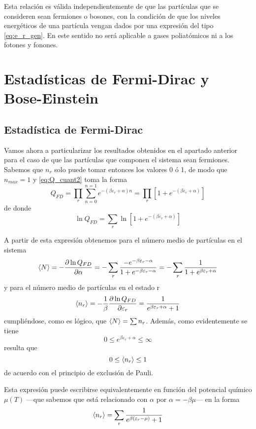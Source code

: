 Esta relación es válida independientemente de que las partículas que se consideren sean fermiones o bosones, con la condición de que los niveles energéticos de una partícula vengan dados por una expresión del tipo \eqref{eq:e_r_gen}.
En este sentido no será aplicable a gases poliatómicos ni a los fotones y fonones.
 
\section{Estadísticas de Fermi-Dirac y Bose-Einstein}
\subsection*{Estadística de Fermi-Dirac}

Vamos ahora a particularizar los resultados obtenidos en el apartado anterior para el caso de que las partículas que componen el sistema sean fermiones.
Sabemos que $n_r$ solo puede tomar entonces los valores 0 ó 1, de modo que $n_{max} = 1$ y \eqref{eq:Q_cuant2} toma la forma
\begin{equation}
	Q_{FD} = \prod_r \sum_{n=0}^{n=1} e^{-(\beta\varepsilon_r + \alpha) n} = \prod_r \left[ 1 + e^{ -( \beta\varepsilon_r + \alpha)} \right]
\end{equation}
de donde
\begin{equation}
	\ln Q_{FD} = \sum_r \ln \left[ 1 + e^{ -( \beta\varepsilon_r + \alpha)} \right]
\end{equation}

A partir de esta expresión obtenemos para el número medio de partículas en el sistema
\begin{equation}
	\expval{N} = - \frac{\partial \ln Q_{FD}}{\partial \alpha} = - \sum_r \frac{-e^{-\beta\varepsilon_r - \alpha}}{1 + e^{-\beta\varepsilon_r - \alpha}} = - \sum_r \frac{1}{1 + e^{\beta\varepsilon_r + \alpha}}
\end{equation}
y para el número medio de partículas en el estado r
\begin{equation}\label{eq:n_r_1}
	\expval{n_r} = - \frac{1}{\beta} \frac{\partial \ln Q_{FD}}{\partial \varepsilon_r} = \frac{1}{e^{\beta\varepsilon_r + \alpha} + 1}
\end{equation}
cumpliéndose, como es lógico, que $\expval{N} = \sum n_r$.
Además, como evidentemente se tiene
$$0 \leq e^{\beta\varepsilon_r + \alpha} \leq \infty$$
resulta que
$$0 \leq \expval{n_r} \leq 1$$
de acuerdo con el principio de exclusión de Pauli.

Esta expresión puede escribirse equivalentemente en función del potencial químico $\mu (T)$ ---que sabemos que está relacionado con $\alpha$ por $\alpha = -\beta\mu$--- en la forma
\begin{equation}\label{eq:n_r_2}
	\expval{n_r} = \sum_r \frac{1}{e^{\beta(\varepsilon_r - \mu)} + 1}
\end{equation}

